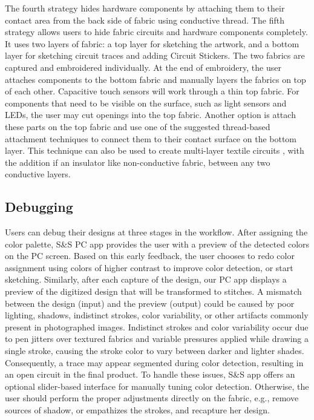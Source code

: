 \documentclass[header.tex]{subfiles}
\begin{document}
The fourth strategy hides hardware components by attaching them to their contact area from the back side of fabric using conductive thread. The fifth strategy allows users to hide fabric circuits and hardware components completely. It uses two layers of fabric: a top layer for sketching the artwork, and a bottom layer for sketching circuit traces and adding Circuit Stickers. The two fabrics are captured and embroidered individually. At the end of embroidery, the user attaches components to the bottom fabric and manually layers the fabrics on top of each other. Capacitive touch sensors will work through a thin top fabric. For components that need to be visible on the surface, such as light sensors and LEDs, the user may cut openings into the top fabric. Another option is attach these parts on the top fabric and use one of the suggested thread-based attachment techniques to connect them to their contact surface on the bottom layer. This technique can also be used to create multi-layer textile circuits \cite{Dunne:2012:MEC:2370216.2370348, 5387040}, with the addition if an insulator like non-conductive fabric, between any two conductive layers. 



\subsection{Debugging}
Users can debug their designs at three stages in the workflow. After assigning the color palette, S\&S PC app provides the user with a preview of the detected colors on the PC screen. Based on this early feedback, the user chooses to redo color assignment using colors of higher contrast to improve color detection, or start sketching. Similarly, after each capture of the design, our PC app displays a preview of the digitized design that will be transformed to stitches. A mismatch between the design (input) and the preview (output) could be caused by poor lighting, shadows, indistinct strokes, color variability, or other artifacts commonly present in photographed images. Indistinct strokes and color variability occur due to pen jitters over textured fabrics and variable pressures applied while drawing a single stroke, causing the stroke color to vary between darker and lighter shades. Consequently, a trace may appear segmented during color detection, resulting in an open circuit in the final product. To handle these issues, S\&S app offers an optional slider-based interface for manually tuning color detection. Otherwise, the user should perform the proper adjustments directly on the fabric, e.g., remove sources of shadow, or empathizes the strokes, and recapture her design. 
\end{document}
